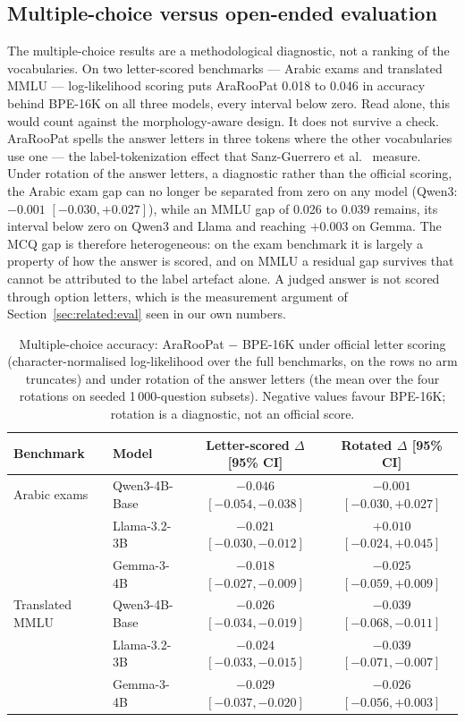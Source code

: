 \documentclass[a4paper,fleqn]{cas-sc}
\begin{document}
\subsection{Multiple-choice versus open-ended evaluation}
\label{sec:results:mcq}

The multiple-choice results are a methodological diagnostic, not a ranking of the vocabularies. On two letter-scored benchmarks --- Arabic exams and translated MMLU --- log-likelihood scoring puts AraRooPat 0.018 to 0.046 in accuracy behind BPE-16K on all three models, every interval below zero. Read alone, this would count against the morphology-aware design. It does not survive a check. AraRooPat spells the answer letters in three tokens where the other vocabularies use one --- the label-tokenization effect that Sanz-Guerrero et al.\ \citep{sanzguerrero2025mind} measure. Under rotation of the answer letters, a diagnostic rather than the official scoring, the Arabic exam gap can no longer be separated from zero on any model (Qwen3: $-0.001$ $[-0.030,+0.027]$), while an MMLU gap of 0.026 to 0.039 remains, its interval below zero on Qwen3 and Llama and reaching $+0.003$ on Gemma. The MCQ gap is therefore heterogeneous: on the exam benchmark it is largely a property of how the answer is scored, and on MMLU a residual gap survives that cannot be attributed to the label artefact alone. A judged answer is not scored through option letters, which is the measurement argument of Section~\ref{sec:related:eval} seen in our own numbers.

\begin{table}[t]
\centering
\caption{Multiple-choice accuracy: AraRooPat $-$ BPE-16K under official letter scoring (character-normalised log-likelihood over the full benchmarks, on the rows no arm truncates) and under rotation of the answer letters (the mean over the four rotations on seeded 1\,000-question subsets). Negative values favour BPE-16K; rotation is a diagnostic, not an official score.}
\label{tab:mcq}
\begin{tabular}{@{}llcc@{}}
\toprule
Benchmark & Model & Letter-scored $\Delta$ [95\% CI] & Rotated $\Delta$ [95\% CI] \\
\midrule
Arabic exams & Qwen3-4B-Base & $-0.046$ $[-0.054,-0.038]$ & $-0.001$ $[-0.030,+0.027]$ \\
 & Llama-3.2-3B & $-0.021$ $[-0.030,-0.012]$ & $+0.010$ $[-0.024,+0.045]$ \\
 & Gemma-3-4B & $-0.018$ $[-0.027,-0.009]$ & $-0.025$ $[-0.059,+0.009]$ \\
\midrule
Translated MMLU & Qwen3-4B-Base & $-0.026$ $[-0.034,-0.019]$ & $-0.039$ $[-0.068,-0.011]$ \\
 & Llama-3.2-3B & $-0.024$ $[-0.033,-0.015]$ & $-0.039$ $[-0.071,-0.007]$ \\
 & Gemma-3-4B & $-0.029$ $[-0.037,-0.020]$ & $-0.026$ $[-0.056,+0.003]$ \\
\bottomrule
\end{tabular}
\end{table}
\end{document}
